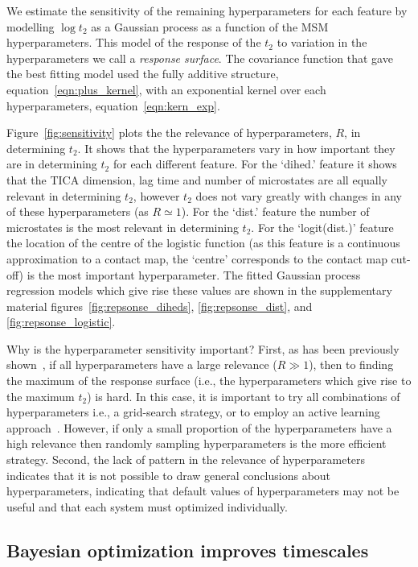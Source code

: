\documentclass[journal=jacsat,manuscript=article]{achemso}
\begin{document}
We estimate the sensitivity of the remaining hyperparameters for each feature by modelling $\log{t_{2}}$ as a Gaussian process as a function of the MSM hyperparameters. This model of the response of the $t_2$ to variation in the hyperparameters we call a \emph{response surface}. The covariance function that gave the best fitting model used the fully additive structure, equation~\ref{eqn:plus_kernel}, with an exponential kernel over each hyperparameters, equation~\ref{eqn:kern_exp}. 

Figure~\ref{fig:sensitivity} plots the  the relevance of hyperparameters, $R$, in determining $t_{2}$. It shows that the hyperparameters vary in how important they are in determining $t_2$ for each different feature.  For the `dihed.' feature it shows that the TICA dimension, lag time and number of microstates are all equally relevant in determining $t_2$, however $t_2$ does not vary greatly with changes in any of these hyperparameters (as $R\simeq 1$). For the `dist.' feature the number of microstates is the most relevant in determining $t_2$. For the `logit(dist.)' feature the location of the centre of the logistic function (as this feature is a continuous approximation to a contact map, the `centre' corresponds  to the contact map cut-off) is the most important hyperparameter. The fitted Gaussian process regression models which give rise these values are shown in the supplementary material figures~\ref{fig:repsonse_diheds}, \ref{fig:repsonse_dist}, and \ref{fig:repsonse_logistic}. 

Why is the hyperparameter sensitivity important? First, as has been  previously shown~\cite{bergstra_jamesbergstra_random_2012}, if all hyperparameters have a large relevance ($R \gg 1$), then to finding the maximum of the response surface (i.e., the hyperparameters which give rise to the maximum $t_2$) is hard. In this case, it is important to try all combinations of hyperparameters i.e., a  grid-search strategy, or to employ an active learning approach~\cite{snoekAbstractBayesianOptimization2013}.  However, if only a small proportion of the hyperparameters have a high relevance then randomly sampling hyperparameters is the more efficient strategy.  Second, the lack of pattern in the relevance of hyperparameters indicates that it is not possible to draw general conclusions about hyperparameters, indicating that default values of hyperparameters may not be useful and that each system must optimized individually. 


\subsection{Bayesian optimization improves timescales}
\end{document}
